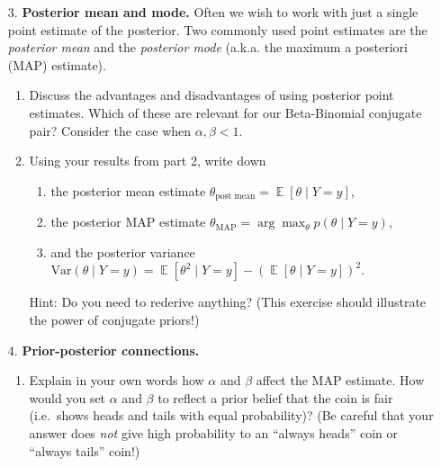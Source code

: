 \documentclass[submit]{harvardml}
\DeclareMathOperator*{\mean}{\mathbb{E}}
\begin{document}
\begin{framed}
  \begin{enumerate}
    \item[3.]
      \textbf{Posterior mean and mode.} Often we wish to work with just a
      single point estimate of the posterior. Two commonly used point
      estimates are the \emph{posterior mean} and the \emph{posterior mode}
      (a.k.a. the maximum a posteriori (MAP) estimate).

      \begin{enumerate}
        \item
              Discuss the advantages and disadvantages of using posterior point
              estimates. Which of these are relevant for our Beta-Binomial conjugate pair? Consider the case when $\alpha, \beta < 1$.

        \item
              Using your results from part 2, write down

              \begin{enumerate}
                \item the posterior mean estimate \(\theta_{\text{post mean}} = \mean [\theta \mid Y = y]\),
                \item the posterior MAP estimate \(\theta_{\text{MAP}}=\arg \max_{\theta}p(\theta \mid Y=y)\),
                \item and the posterior variance $\mathrm{Var}(\theta \mid Y = y) = \mean[\theta^2 \mid Y = y] - (\mean[\theta \mid Y = y])^2$.
              \end{enumerate}

              Hint: Do you need to rederive anything? (This exercise should illustrate the power of conjugate priors!)

      \end{enumerate}

    \item[4.]
      \textbf{Prior-posterior connections.}

      \begin{enumerate}
        \item
              Explain in your own words how \(\alpha\) and \(\beta\) affect the
              MAP estimate. How would you set \(\alpha\) and \(\beta\) to reflect
              a prior belief that the coin is fair (i.e.~shows heads and tails
              with equal probability)? (Be careful that your answer does \emph{not} give high probability to an ``always heads'' coin or ``always tails'' coin!)


\end{enumerate}
\end{enumerate}
\end{framed}
\end{document}
